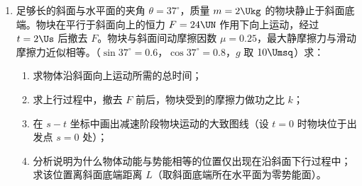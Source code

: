 \documentclass[\gkver]{gaokaozhenti}
\begin{document}
\begin{enumerate}
{$F_{\text{安}} = BIL = B \cdot \frac{E - BLv}{R + r} \cdot L = ma$

由此式可知，随着 $v$ 的增加，$I$ 减小，$a$ 减小，棒做加速度减小的加速运动。

当 $E = BLv$ 时，$I = 0$，最后棒做匀速直线运动。

此过程中，电池的电能一部分转化为内电路和金属棒的内能，一部分转化为棒的动能。
}

\item
足够长的斜面与水平面的夹角 $\theta = 37^{\circ}$，质量 $m = 2\Ukg$ 的物块静止于斜面底端。物块在平行于斜面向上的恒力 $F = 24\UN$ 作用下向上运动，经过 $t = 2\Us$ 后撤去 $F$。物块与斜面间动摩擦因数 $\mu = 0.25$，最大静摩擦力与滑动摩擦力近似相等。（$\sin 37^{\circ} = 0.6$，$\cos 37^{\circ} = 0.8$，$g$ 取 $10\Umsq$）求：
\begin{enumerate}
	\item
	求物体沿斜面向上运动所需的总时间；
	\item
	求上行过程中，撤去 $F$ 前后，物块受到的摩擦力做功之比 $k$；
	\item
	在 $s-t$ 坐标中画出减速阶段物块运动的大致图线（设 $t = 0$ 时物块位于出发点 $s = 0$ 处）；
	\item
	分析说明为什么物体动能与势能相等的位置仅出现在沿斜面下行过程中；求该位置离斜面底端距离 $L$（取斜面底端所在水平面为零势能面）。
\end{enumerate}
\end{enumerate}
\end{document}
